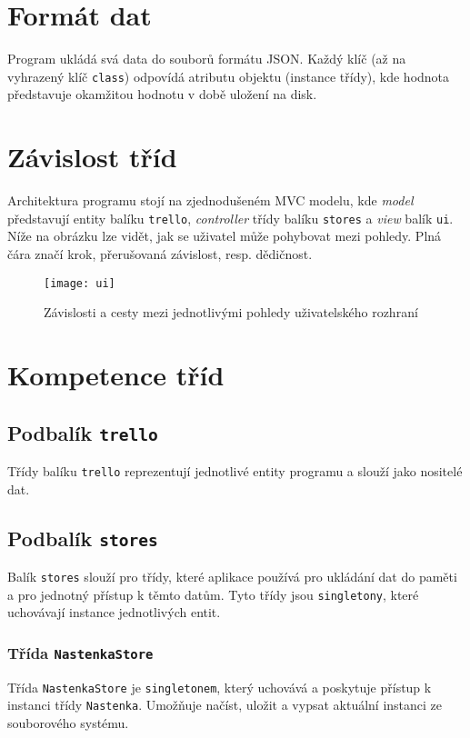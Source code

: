 \documentclass[FM,DP]{tulthesis}
\begin{document}
\section{Formát dat}
Program ukládá svá data do souborů formátu JSON. Každý klíč (až na vyhrazený klíč \texttt{class}) odpovídá atributu objektu (instance třídy), kde hodnota představuje okamžitou hodnotu v době uložení na disk.

\section{Závislost tříd}
Architektura programu stojí na zjednodušeném MVC modelu, kde \textit{model} představují entity balíku \texttt{trello}, \textit{controller} třídy balíku \texttt{stores} a \textit{view} balík \texttt{ui}. Níže na obrázku lze vidět, jak se uživatel může pohybovat mezi pohledy. Plná čára značí krok, přerušovaná závislost, resp. dědičnost.

\begin{figure}[H]
	\centering
	\texttt{[image: ui]}
	\caption{Závislosti a cesty mezi jednotlivými pohledy uživatelského rozhraní}
\end{figure}


\section{Kompetence tříd}
\subsection{Podbalík \texttt{trello}}
Třídy balíku \texttt{trello} reprezentují jednotlivé entity programu a slouží jako nositelé dat.

\subsection{Podbalík \texttt{stores}}
Balík \texttt{stores} slouží pro třídy, které aplikace používá pro ukládání dat do paměti a pro jednotný přístup k těmto datům. Tyto třídy jsou \texttt{singletony}, které uchovávají instance jednotlivých entit.

\subsubsection{Třída \texttt{NastenkaStore}}
Třída \texttt{NastenkaStore} je \texttt{singletonem}, který uchovává a poskytuje přístup k instanci třídy \texttt{Nastenka}. Umožňuje načíst, uložit a vypsat aktuální instanci ze souborového systému.
\end{document}
